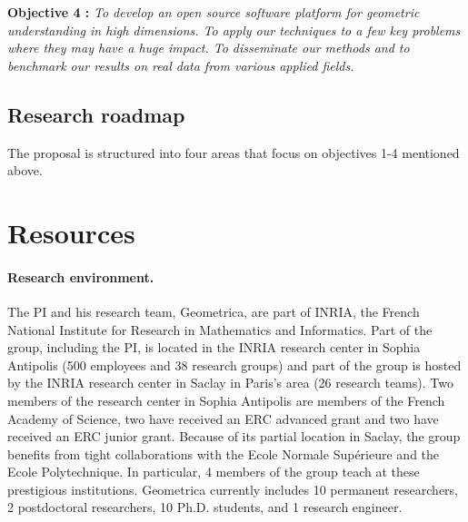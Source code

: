 {\bf Objective 4 :}   {\em To develop an open source {\em  software platform for geometric understanding in high dimensions}. %
To apply our techniques to a few key problems where they may have a huge impact. To disseminate our methods and to benchmark our results on real data from various applied fields.}

\subsection{Research roadmap} 


%


The proposal is structured into four areas that focus on objectives 1-4 mentioned above.









\section{Resources}

\paragraph{Research environment.}
The PI and his research team, Geometrica, are part of INRIA, the French National Institute for Research in Mathematics and Informatics. Part of the group, including the PI, is located in the INRIA research center in Sophia Antipolis  (500 employees and 38 research groups) and part of the group is hosted by the INRIA research center in Saclay in Paris's area (26 research teams). Two members of the research center in Sophia Antipolis are members of the French Academy of Science, two have received an ERC advanced grant and two have received an ERC junior grant. Because of its partial location in Saclay, the group benefits from tight collaborations with the Ecole Normale Sup\'erieure and the Ecole Polytechnique. In particular, 4 members of the group teach at these prestigious institutions. Geometrica currently includes 10 permanent researchers,  2 postdoctoral researchers, 10 Ph.D. students, and 1 research engineer. 

